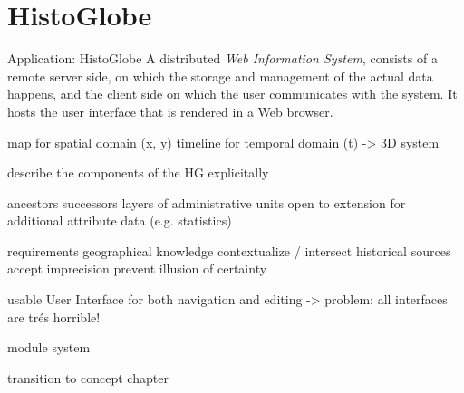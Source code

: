 




\section{HistoGlobe} %
\label{sec:histoglobe}


Application: HistoGlobe
A distributed \emph{Web Information System}, consists of a remote server side, on which the storage and management of the actual data happens, and the client side on which the user communicates with the system. It hosts the user interface that is rendered in a Web browser.

map for spatial domain (x, y)
timeline for temporal domain (t)
-> 3D system

describe the components of the HG explicitally

ancestors successors
layers of administrative units
open to extension for additional attribute data (e.g. statistics)

requirements
  geographical knowledge
  contextualize / intersect historical sources
  accept imprecision
  prevent illusion of certainty

usable User Interface for both navigation and editing
-> problem: all interfaces are trés horrible!

module system




\vspace{2em}

transition to concept chapter
